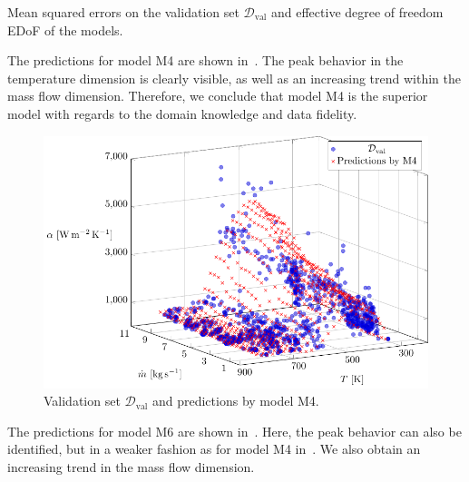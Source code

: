\begin{table}[H]
	\begin{center}
	\end{center}
	\caption{Mean squared errors on the validation set $\mathcal{D}_{\text{val}}$ and effective degree of freedom EDoF of the models.}
	\label{tab:ebner-mse-val}
\end{table}

The predictions for model M4 are shown in~. The peak behavior in the temperature dimension is clearly visible, as well as an increasing trend within the mass flow dimension. Therefore, we conclude that model M4 is the superior model with regards to the domain knowledge and data fidelity. 

\begin{figure}[H]
	\centering
	\includegraphics[width=\columnwidth]{graphics/pgfplots/cha5/Ebner/M4.pdf}
	\caption{Validation set $\mathcal{D}_{\text{val}}$ and predictions by model M4.}
	\label{fig:ebner-M4}
\end{figure}

The predictions for model M6 are shown in~. Here, the peak behavior can also be identified, but in a weaker fashion as for model M4 in~. We also obtain an increasing trend in the mass flow dimension. 

